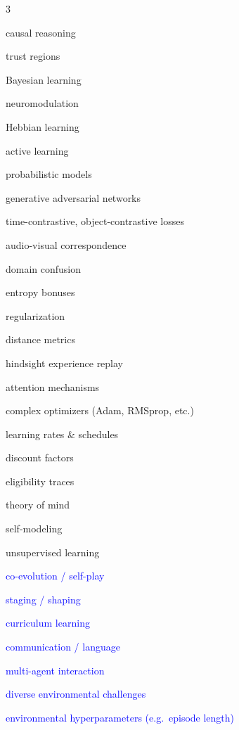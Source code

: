 \documentclass{article}
\begin{document}
\begin{table}
\begin{multicols}{3}
\begin{itemize}
{\item [$\diamond$] causal reasoning
\item [$\diamond$] trust regions
\item [$\diamond$] Bayesian learning
\item [$\diamond$] neuromodulation
\item [$\diamond$] Hebbian learning
\item [$\diamond$] active learning
\item [$\diamond$] probabilistic models
\item [$\diamond$] generative adversarial networks
\item [$\diamond$] time-contrastive, object-contrastive losses
\item [$\diamond$] audio-visual correspondence
\item [$\diamond$] domain confusion
\item [$\diamond$] entropy bonuses 
\item [$\diamond$] regularization 
\item [$\diamond$] distance metrics
\item [$\diamond$] hindsight experience replay
\item [$\diamond$] attention mechanisms
\item [$\diamond$] complex optimizers (Adam, RMSprop, etc.)
\item [$\diamond$] learning rates \& schedules
\item [$\diamond$] discount factors
\item [$\diamond$] eligibility traces
\item [$\diamond$] theory of mind
\item [$\diamond$] self-modeling
\item [$\diamond$] unsupervised learning
}
\textcolor{blue}
{
\item [$\dagger$] co-evolution / self-play
\item [$\dagger$] staging / shaping 
\item [$\dagger$] curriculum learning
\item [$\dagger$] communication / language
\item [$\dagger$] multi-agent interaction
\item [$\dagger$] diverse environmental challenges
\item [$\dagger$] environmental hyperparameters (e.g.\ episode length)
}
    \end{itemize}
    \end{multicols}
\end{table}
\end{document}
